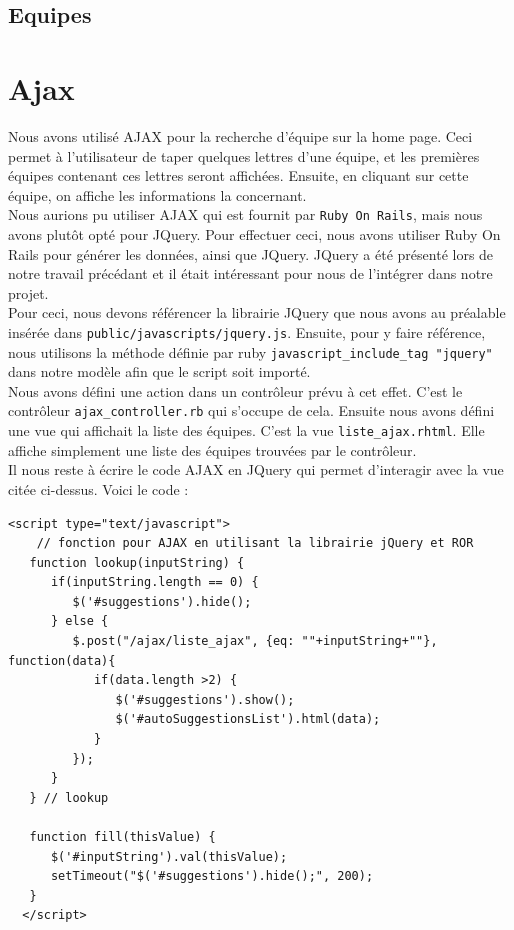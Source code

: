 \documentclass[10pt,a4paper,titlepage]{article}
\begin{document}
\subsection{Equipes}

\section{Ajax}

Nous avons utilisé AJAX pour la recherche d'équipe sur la home page. Ceci permet à l'utilisateur de taper quelques lettres d'une équipe, et les premières équipes contenant ces lettres seront affichées. Ensuite, en cliquant sur cette équipe, on affiche les informations la concernant. \\

Nous aurions pu utiliser AJAX qui est fournit par \texttt{Ruby On Rails}, mais nous avons plutôt opté pour JQuery. Pour effectuer ceci, nous avons utiliser Ruby On Rails pour générer les données, ainsi que JQuery. JQuery a été présenté lors de notre travail précédant et il était intéressant pour nous de l'intégrer dans notre projet. \\

Pour ceci, nous devons référencer la librairie JQuery que nous avons au préalable insérée dans \texttt{public/javascripts/jquery.js}. Ensuite, pour y faire référence, nous utilisons la méthode définie par ruby \texttt{javascript\_include\_tag "jquery"} dans notre modèle afin que le script soit importé. \\

Nous avons défini une action dans un contrôleur prévu à cet effet. C'est le contrôleur \texttt{ajax\_controller.rb} qui s'occupe de cela. Ensuite nous avons défini une vue qui affichait la liste des équipes. C'est la vue \texttt{liste\_ajax.rhtml}. Elle affiche simplement une liste des équipes trouvées par le contrôleur. \\

Il nous reste à écrire le code AJAX en JQuery qui permet d'interagir avec la vue citée ci-dessus. Voici le code :

\begin{lstlisting}
<script type="text/javascript">
  	// fonction pour AJAX en utilisant la librairie jQuery et ROR
   function lookup(inputString) {
      if(inputString.length == 0) {
         $('#suggestions').hide();
      } else {
         $.post("/ajax/liste_ajax", {eq: ""+inputString+""}, function(data){
            if(data.length >2) {
               $('#suggestions').show();
               $('#autoSuggestionsList').html(data);
            }
         });
      }
   } // lookup
   
   function fill(thisValue) {
      $('#inputString').val(thisValue);
      setTimeout("$('#suggestions').hide();", 200);
   }
  </script>
\end{lstlisting}
\end{document}
